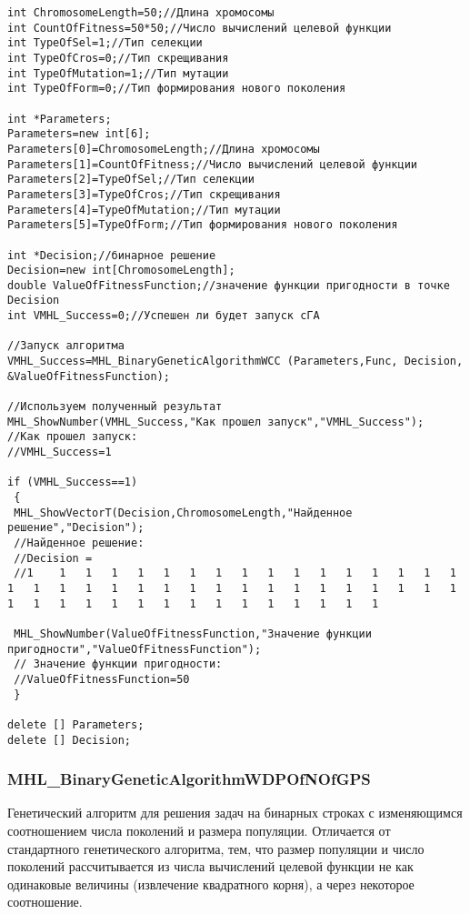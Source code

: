 \documentclass[a4paper,12pt]{article}
\begin{document}
\begin{lstlisting}[label=code_use_MHL_BinaryGeneticAlgorithmWCC,caption=Пример использования]
int ChromosomeLength=50;//Длина хромосомы
int CountOfFitness=50*50;//Число вычислений целевой функции
int TypeOfSel=1;//Тип селекции
int TypeOfCros=0;//Тип скрещивания
int TypeOfMutation=1;//Тип мутации
int TypeOfForm=0;//Тип формирования нового поколения

int *Parameters;
Parameters=new int[6];
Parameters[0]=ChromosomeLength;//Длина хромосомы
Parameters[1]=CountOfFitness;//Число вычислений целевой функции
Parameters[2]=TypeOfSel;//Тип селекции
Parameters[3]=TypeOfCros;//Тип скрещивания
Parameters[4]=TypeOfMutation;//Тип мутации
Parameters[5]=TypeOfForm;//Тип формирования нового поколения

int *Decision;//бинарное решение
Decision=new int[ChromosomeLength];
double ValueOfFitnessFunction;//значение функции пригодности в точке Decision
int VMHL_Success=0;//Успешен ли будет запуск cГА

//Запуск алгоритма
VMHL_Success=MHL_BinaryGeneticAlgorithmWCC (Parameters,Func, Decision, &ValueOfFitnessFunction);

//Используем полученный результат
MHL_ShowNumber(VMHL_Success,"Как прошел запуск","VMHL_Success");
//Как прошел запуск:
//VMHL_Success=1

if (VMHL_Success==1)
 {
 MHL_ShowVectorT(Decision,ChromosomeLength,"Найденное решение","Decision");
 //Найденное решение:
 //Decision =
 //1	1	1	1	1	1	1	1	1	1	1	1	1	1	1	1	1	1	1	1	1	1	1	1	1	1	1	1	1	1	1	1	1	1	1	1	1	1	1	1	1	1	1	1	1	1	1	1	1	1

 MHL_ShowNumber(ValueOfFitnessFunction,"Значение функции пригодности","ValueOfFitnessFunction");
 // Значение функции пригодности:
 //ValueOfFitnessFunction=50
 }

delete [] Parameters;
delete [] Decision;
\end{lstlisting}

\subsubsection{MHL\_BinaryGeneticAlgorithmWDPOfNOfGPS}\label{MHL_BinaryGeneticAlgorithmWDPOfNOfGPS}

Генетический алгоритм для решения задач на бинарных строках с изменяющимся соотношением числа поколений и размера популяции. Отличается от стандартного генетического алгоритма, тем, что размер популяции и число поколений рассчитывается из числа вычислений целевой функции не как одинаковые величины (извлечение квадратного корня), а через некоторое соотношение.
\end{document}
